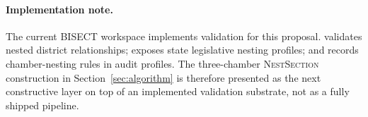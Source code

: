 \paragraph{Implementation note.}  The current BISECT workspace implements
validation for this proposal.   validates nested
district relationships;  exposes state legislative
nesting profiles; and  records chamber-nesting rules in
audit profiles.  The three-chamber \textsc{NestSection} construction in
Section~\ref{sec:algorithm} is therefore presented as the next constructive
layer on top of an implemented validation substrate, not as a fully shipped
pipeline.
